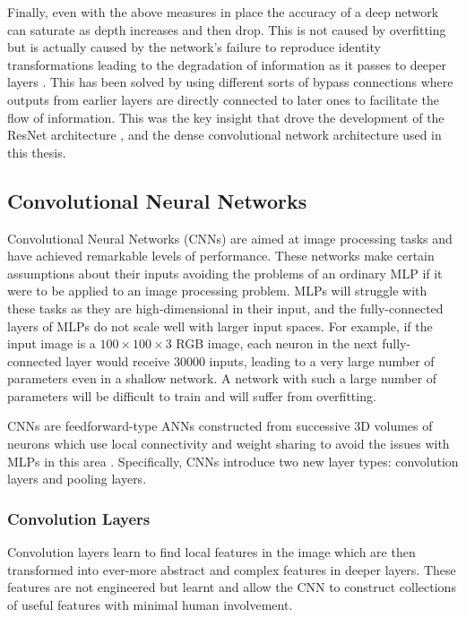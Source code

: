 Finally, even with the above measures in place the accuracy of a deep network can saturate as depth increases and then drop. This is not caused by overfitting but is actually caused by the network's failure to reproduce identity transformations leading to the degradation of information as it passes to deeper layers \cite{ResNet}. This has been solved by using different sorts of bypass connections where outputs from earlier layers are directly connected to later ones to facilitate the flow of information. This was the key insight that drove the development of the ResNet architecture \cite{ResNet}, and the dense convolutional network architecture used in this thesis.  


\subsection{Convolutional Neural Networks}
Convolutional Neural Networks (CNNs) are aimed at image processing tasks and have achieved remarkable levels of performance. 
These networks make certain assumptions about their inputs avoiding the problems of an ordinary MLP if it were to be applied to an image processing problem. 
MLPs will struggle with these tasks as they are high-dimensional in their input, and the fully-connected layers of MLPs do not scale well with larger input spaces. 
For example, if the input image is a $100\times{}100\times{}3$ RGB image, each neuron in the next fully-connected layer would receive $30000$ inputs, leading to a very large number of parameters even in a shallow network. 
A network with such a large number of parameters will be difficult to train and will suffer from overfitting.

CNNs are feedforward-type ANNs constructed from successive 3D volumes of neurons which use local connectivity and weight sharing to avoid the issues with MLPs in this area \cite{CS231n}. Specifically, CNNs introduce two new layer types: convolution layers and pooling layers.

\subsubsection{Convolution Layers}
Convolution layers learn to find local features in the image which are then transformed into ever-more abstract and complex features in deeper layers. 
These features are not engineered but learnt and allow the CNN to construct collections of useful features with minimal human involvement.


